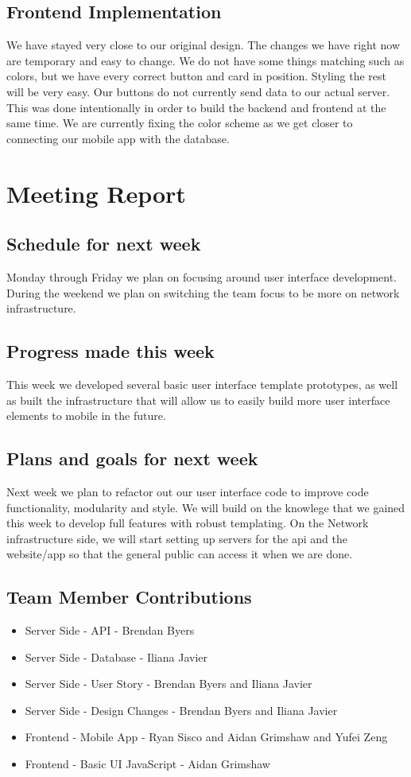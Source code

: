 \documentclass[12pt]{article}
\begin{document}
\subsection{Frontend Implementation}
We have stayed very close to our original design. The changes we have right now are temporary and easy to change. We do not have some things matching such as colors, but we have every correct button and card in position. Styling the rest will be very easy. Our buttons do not currently send data to our actual server. This was done intentionally in order to build the backend and frontend at the same time. We are currently fixing the color scheme as we get closer to connecting our mobile app with the database.
\section{Meeting Report}
\subsection{Schedule for next week}
Monday through Friday we plan on focusing around user interface development. During the weekend we plan on switching the team focus to be more on network infrastructure.
\subsection{Progress made this week}
This week we developed several basic user interface template prototypes, as well as built the infrastructure that will allow us to easily build more user interface elements to mobile in the future.
\subsection{Plans and goals for next week}
Next week we plan to refactor out our user interface code to improve code functionality, modularity and style. We will build on the knowlege that we gained this week to develop full features with robust templating. On the Network infrastructure side, we will start setting up servers for the api and the website/app so that the general public can access it when we are done.
\subsection{Team Member Contributions}
\begin{itemize}
      \item Server Side - API - Brendan Byers
      \item Server Side - Database - Iliana Javier
      \item Server Side - User Story - Brendan Byers and Iliana Javier
      \item Server Side - Design Changes - Brendan Byers and Iliana Javier
      \item Frontend - Mobile App - Ryan Sisco and Aidan Grimshaw and Yufei Zeng
      \item Frontend - Basic UI JavaScript - Aidan Grimshaw
\end{itemize}
\end{document}
